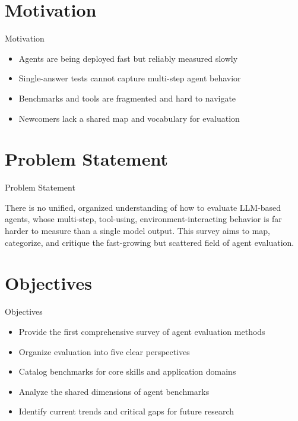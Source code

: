 \documentclass[10pt]{beamer}
\begin{document}
\section{Motivation}
\begin{frame}{Motivation}
\begin{itemize}
  \item Agents are being deployed fast but reliably measured slowly
  \item Single-answer tests cannot capture multi-step agent behavior
  \item Benchmarks and tools are fragmented and hard to navigate
  \item Newcomers lack a shared map and vocabulary for evaluation
\end{itemize}
\end{frame}

\section{Problem Statement}
\begin{frame}{Problem Statement}
  \begin{block}{}
  There is no unified, organized understanding of how to evaluate LLM-based agents, whose multi-step, tool-using, environment-interacting behavior is far harder to measure than a single model output. This survey aims to map, categorize, and critique the fast-growing but scattered field of agent evaluation.
  \end{block}
\end{frame}

\section{Objectives}
\begin{frame}{Objectives}
\begin{itemize}
  \item Provide the first comprehensive survey of agent evaluation methods
  \item Organize evaluation into five clear perspectives
  \item Catalog benchmarks for core skills and application domains
  \item Analyze the shared dimensions of agent benchmarks
  \item Identify current trends and critical gaps for future research
\end{itemize}
\end{frame}
\end{document}
